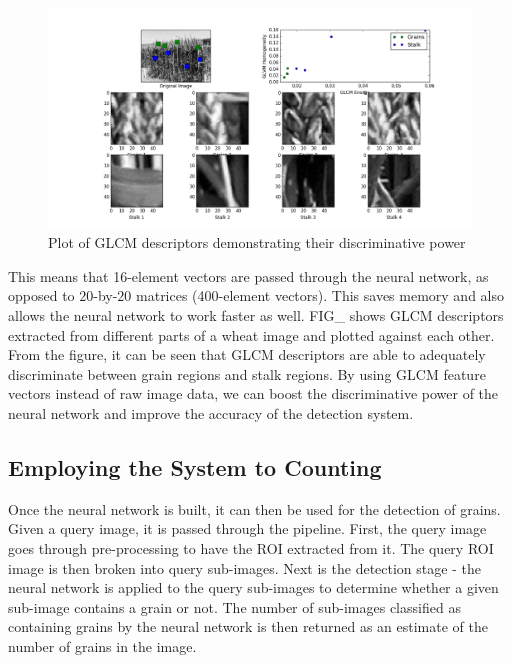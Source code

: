 \begin{figure}[ht!]
\centering
\includegraphics[scale=0.3]{glcm_1}
\caption{Plot of GLCM descriptors demonstrating their discriminative power}
\label{fig1}
\end{figure}
This means that 16-element vectors are passed through the neural network, as opposed to $20$-by-$20$ matrices (400-element vectors). This saves memory and also allows the neural network to work faster as well. FIG\_ shows GLCM descriptors extracted from different parts of a wheat image and plotted against each other. From the figure, it can be seen that GLCM descriptors are able to adequately discriminate between grain regions and stalk regions. By using GLCM feature vectors instead of raw image data, we can boost the discriminative power of the neural network and improve the accuracy of the detection system.

\subsection{Employing the System to Counting}
Once the neural network is built, it can then be used for the detection of grains. Given a query image, it is passed through the pipeline. First, the query image goes through pre-processing to have the ROI extracted from it. The query ROI image is then broken into query sub-images. Next is the detection stage - the neural network is applied to the query sub-images to determine whether a given sub-image contains a grain or not. The number of sub-images classified as containing grains by the neural network is then returned as an estimate of the number of grains in the image.
\bigskip

\goodbreak




\bigskip




